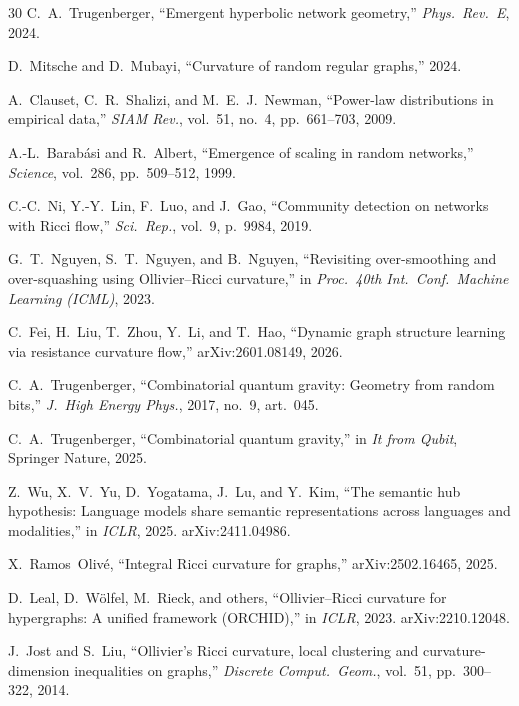 \documentclass[11pt,a4paper]{article}
\begin{document}
\begin{thebibliography}{30}
C.~A.~Trugenberger, ``Emergent hyperbolic network geometry,'' \emph{Phys.~Rev.~E}, 2024.

D.~Mitsche and D.~Mubayi, ``Curvature of random regular graphs,'' 2024.

A.~Clauset, C.~R.~Shalizi, and M.~E.~J.~Newman, ``Power-law distributions in empirical data,'' \emph{SIAM Rev.}, vol.~51, no.~4, pp.~661--703, 2009.

A.-L.~Barab\'asi and R.~Albert, ``Emergence of scaling in random networks,''
\emph{Science}, vol.~286, pp.~509--512, 1999.

C.-C.~Ni, Y.-Y.~Lin, F.~Luo, and J.~Gao, ``Community detection on networks
with Ricci flow,'' \emph{Sci.~Rep.}, vol.~9, p.~9984, 2019.

G.~T.~Nguyen, S.~T.~Nguyen, and B.~Nguyen,
``Revisiting over-smoothing and over-squashing using Ollivier--Ricci curvature,''
in \emph{Proc.\ 40th Int.\ Conf.\ Machine Learning (ICML)}, 2023.

C.~Fei, H.~Liu, T.~Zhou, Y.~Li, and T.~Hao,
``Dynamic graph structure learning via resistance curvature flow,''
arXiv:2601.08149, 2026.

C.~A.~Trugenberger,
``Combinatorial quantum gravity: Geometry from random bits,''
\emph{J.~High Energy Phys.}, 2017, no.~9, art.~045.

C.~A.~Trugenberger,
``Combinatorial quantum gravity,''
in \emph{It from Qubit}, Springer Nature, 2025.

Z.~Wu, X.~V.~Yu, D.~Yogatama, J.~Lu, and Y.~Kim,
``The semantic hub hypothesis: Language models share semantic representations
across languages and modalities,''
in \emph{ICLR}, 2025. arXiv:2411.04986.

X.~Ramos~Oliv\'e,
``Integral Ricci curvature for graphs,''
arXiv:2502.16465, 2025.

D.~Leal, D.~Wölfel, M.~Rieck, and others,
``Ollivier--Ricci curvature for hypergraphs: A unified framework (ORCHID),''
in \emph{ICLR}, 2023. arXiv:2210.12048.

J.~Jost and S.~Liu,
``Ollivier's Ricci curvature, local clustering and curvature-dimension inequalities on graphs,''
\emph{Discrete Comput.\ Geom.}, vol.~51, pp.~300--322, 2014.


\end{thebibliography}
\end{document}
